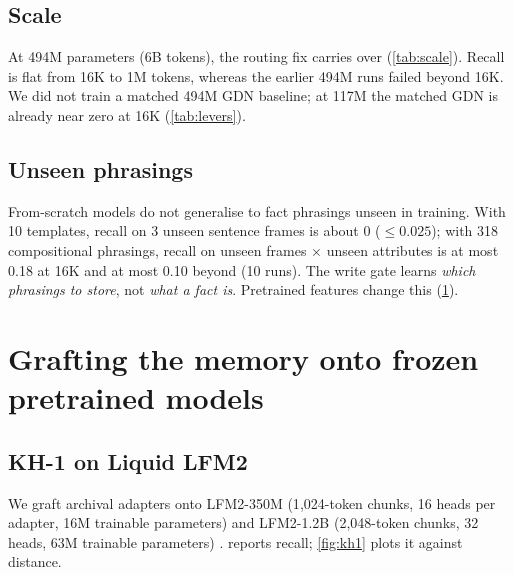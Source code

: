 \documentclass[11pt]{article}
\newcommand{\KH}{KH-1}
\begin{document}
\subsection{Scale}
At 494M parameters (6B tokens), the routing fix carries over (\cref{tab:scale}). Recall is flat from 16K to 1M tokens, whereas the earlier 494M runs failed beyond 16K. We did not train a matched 494M GDN baseline; at 117M the matched GDN is already near zero at 16K (\cref{tab:levers}).

\begin{table}[t]
\centering
\caption{494M models: recall $K = 1$ / $K = 8$ at inference threshold 0.9, and validation perplexity.}
\label{tab:scale}
\end{table}

\subsection{Unseen phrasings}
From-scratch models do not generalise to fact phrasings unseen in training. With 10 templates, recall on 3 unseen sentence frames is about 0 ($\le 0.025$); with 318 compositional phrasings, recall on unseen frames $\times$ unseen attributes is at most 0.18 at 16K and at most 0.10 beyond (10 runs). The write gate learns \emph{which phrasings to store}, not \emph{what a fact is}. Pretrained features change this (\cref{sec:graft}).

\section{Grafting the memory onto frozen pretrained models}
\label{sec:graft}
\subsection{\KH{} on Liquid LFM2}
We graft archival adapters onto LFM2-350M (1{,}024-token chunks, 16 heads per adapter, 16M trainable parameters) and LFM2-1.2B (2{,}048-token chunks, 32 heads, 63M trainable parameters) \citep{lfm2}.  reports recall; \cref{fig:kh1} plots it against distance.
\end{document}
